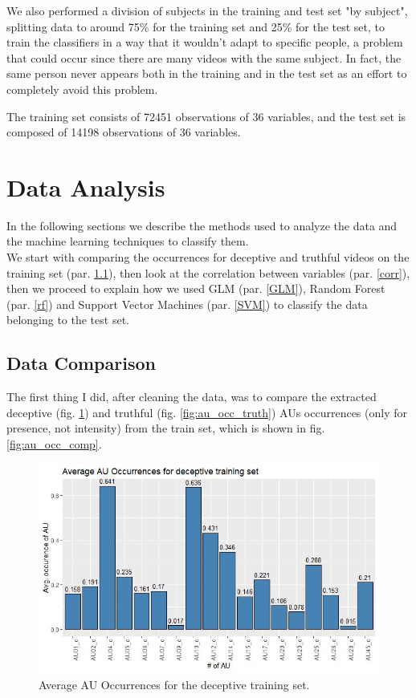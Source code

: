 We also performed a division of subjects in the training and test set "by subject", splitting data to around 75\% for the training set and 25\% for the test set, to train the classifiers in a way that it wouldn't adapt to specific people, a problem that could occur since there are many videos with the same subject. In fact, the same person never appears both in the training and in the test set as an effort to completely avoid this problem.

The training set consists of 72451 observations of 36 variables, and the test set is composed of 14198 observations of 36 variables.

\clearpage

\section{Data Analysis} \label{data_an}
In the following sections we describe the methods used to analyze the data and the machine learning techniques to classify them. \\
We start with comparing the occurrences for deceptive and truthful videos on the training set (par. \ref{data_comp}), then look at the correlation between variables (par. \ref{corr}), then we proceed to explain how we used GLM (par. \ref{GLM}), Random Forest (par. \ref{rf}) and Support Vector Machines (par. \ref{SVM}) to classify the data belonging to the test set.

\subsection{Data Comparison} \label{data_comp}
The first thing I did, after cleaning the data, was to compare the extracted deceptive (fig. \ref{fig:au_occ_dec}) and truthful (fig. \ref{fig:au_occ_truth}) AUs occurrences (only for presence, not intensity) from the train set, which is shown in fig. \ref{fig:au_occ_comp}.

\begin{figure}[H]
	\centering
	\includegraphics[width=1\textwidth]{images/au_occ_dec}
	\caption{Average AU Occurrences for the deceptive training set.}
	\label{fig:au_occ_dec}
\end{figure}

